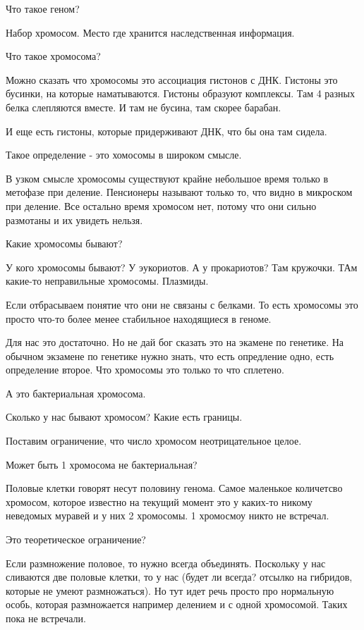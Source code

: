 ﻿Что такое геном? 

Набор хромосом. Место где хранится наследственная информация. 

Что такое хромосома? 

Можно сказать что хромосомы это ассоциация гистонов с ДНК. 
Гистоны это бусинки, на которые наматываются. Гистоны образуют комплексы. 
Там 4 разных белка слепляются вместе. И там не бусина, там скорее барабан. 

И еще есть гистоны, которые придерживают ДНК, что бы она там сидела. 

Такое определение - это хомосомы в широком смысле. 

В узком смысле хромосомы существуют крайне небольшое время только 
в метофазе при деление. Пенсионеры называют только то, что 
видно в микроском при деление. Все остально время хромосом нет, 
потому что они сильно размотаны и их увидеть нельзя. 

Какие хромосомы бывают? 

У кого хромосомы бывают? 
У эукориотов. А у прокариотов? Там кружочки. ТАм какие-то 
неправильные хромосомы. Плазмиды. 

Если отбрасываем понятие что они не связаны с белками. То есть
хромосомы это просто что-то более менее стабильное находящиеся в
геноме.

Для нас это достаточно. Но не дай бог сказать это на экамене по
генетике. На обычном экзамене по генетике нужно знать,
что есть опредление одно, есть определение второе. Что
хромосомы это только то что сплетено.

А это бактериальная хромосома.

Сколько у нас бывают хромосом? Какие есть границы.

Поставим ограничение, что число хромосом неотрицательное целое.

Может быть 1 хромосома не бактериальная?

Половые клетки говорят несут половину генома. Самое маленькое количетсво 
хромосом, которое известно на текущий момент 
это у каких-то никому неведомых муравей и у них 2 хромосомы. 1 хромосмоу
никто не встречал. 

Это теоретическое ограничение? 

Если размножение половое, то нужно всегда объединять. Поскольку у нас 
сливаются две половые клетки, то у нас (будет ли всегда? отсылко на гибридов, которые не умеют 
размножаться). Но тут идет речь просто про нормальную особь, которая размножается например делением 
и с одной хромосомой. Таких пока не встречали. 

